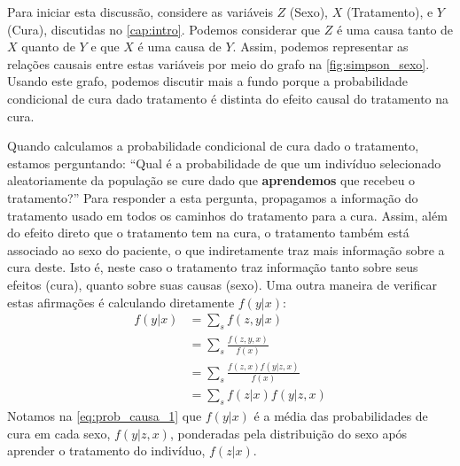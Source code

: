 Para iniciar esta discussão, considere
as variáveis $Z$ (Sexo), $X$ (Tratamento), 
e $Y$ (Cura), discutidas no \cref{cap:intro}.
Podemos considerar que $Z$ é uma causa
tanto de $X$ quanto de $Y$ e que
$X$ é uma causa de $Y$. Assim,
podemos representar as relações causais 
entre estas variáveis por meio do grafo
na \cref{fig:simpson_sexo}.
Usando este grafo, podemos 
discutir mais a fundo porque 
a probabilidade condicional de cura dado tratamento é
distinta do efeito causal do tratamento na cura.

Quando calculamos a probabilidade condicional
de cura dado o tratamento, estamos perguntando:
``Qual é a probabilidade de que um indivíduo selecionado
  aleatoriamente da população se cure dado que
  \textbf{aprendemos} que recebeu o tratamento?''
Para responder a esta pergunta, propagamos
a informação do tratamento usado em 
todos os caminhos do tratamento para a cura.
Assim, além do efeito direto que o tratamento tem na cura,
o tratamento também está associado ao sexo do paciente,
o que indiretamente traz mais informação sobre a cura deste.
Isto é, neste caso o tratamento traz informação
tanto sobre seus efeitos (cura), 
quanto sobre suas causas (sexo).
Uma outra maneira de verificar estas afirmações é
calculando diretamente $f(y|x)$:
\begin{align}
 \label{eq:prob_causa_1}
 f(y|x)
 &= \sum_s f(z,y|x) \nonumber \\
 &= \sum_s \frac{f(z,y,x)}{f(x)} \nonumber \\
 &= \sum_s \frac{f(z,x)f(y|z,x)}{f(x)} \nonumber \\
 &= \sum_s f(z|x)f(y|z,x)
\end{align}
Notamos na \cref{eq:prob_causa_1} que 
$f(y|x)$ é a média das probabilidades de cura em 
cada sexo, $f(y|z,x)$,
ponderadas pela distribuição do sexo
após aprender o tratamento do indivíduo, $f(z|x)$.

